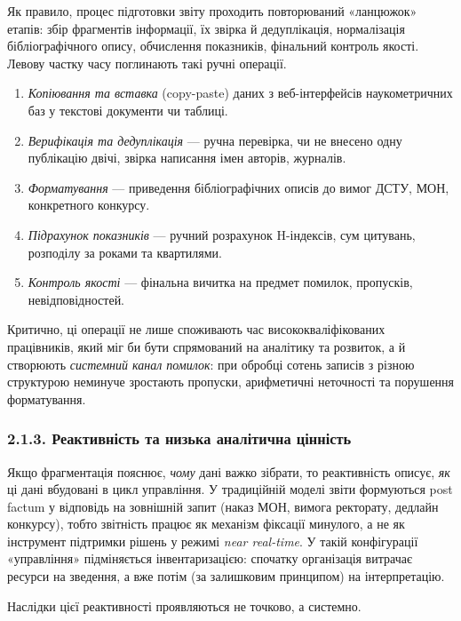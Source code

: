 Як правило, процес підготовки звіту проходить повторюваний «ланцюжок» етапів: збір фрагментів інформації, їх звірка й дедуплікація, нормалізація бібліографічного опису, обчислення показників, фінальний контроль якості. Левову частку часу поглинають такі ручні операції.

\begin{enumerate}[leftmargin=*,itemsep=0.2em]
\item \textit{Копіювання та вставка} (copy-paste) даних з веб-інтерфейсів наукометричних баз у текстові документи чи таблиці.
\item \textit{Верифікація та дедуплікація} --- ручна перевірка, чи не внесено одну публікацію двічі, звірка написання імен авторів, журналів.
\item \textit{Форматування} --- приведення бібліографічних описів до вимог ДСТУ, МОН, конкретного конкурсу.
\item \textit{Підрахунок показників} --- ручний розрахунок H-індексів, сум цитувань, розподілу за роками та квартилями.
\item \textit{Контроль якості} --- фінальна вичитка на предмет помилок, пропусків, невідповідностей.
\end{enumerate}

Критично, ці операції не лише споживають час висококваліфікованих працівників, який міг би бути спрямований на аналітику та розвиток, а й створюють \textit{системний канал помилок}: при обробці сотень записів з різною структурою неминуче зростають пропуски, арифметичні неточності та порушення форматування.

\subsubsection*{2.1.3. Реактивність та низька аналітична цінність}

Якщо фрагментація пояснює, \textit{чому} дані важко зібрати, то реактивність описує, \textit{як} ці дані вбудовані в цикл управління. У традиційній моделі звіти формуються post factum у відповідь на зовнішній запит (наказ МОН, вимога ректорату, дедлайн конкурсу), тобто звітність працює як механізм фіксації минулого, а не як інструмент підтримки рішень у режимі \textit{near real-time}. У такій конфігурації «управління» підміняється інвентаризацією: спочатку організація витрачає ресурси на зведення, а вже потім (за залишковим принципом) на інтерпретацію.

Наслідки цієї реактивності проявляються не точково, а системно.

